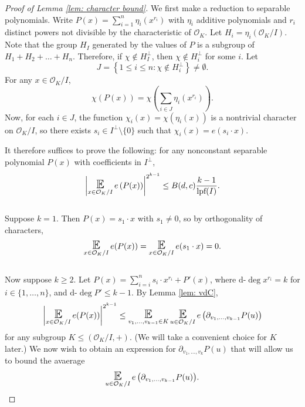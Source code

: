 \documentclass{amsart}
\theoremstyle{definition}
\numberwithin{equation}{section}
\newcommand{\mO}{\mathcal{O}}
\newcommand{\es}{\emptyset}
\newcommand{\lpf}{\normalfont\text{lpf}}
\DeclareMathOperator*{\E}{\text{\Large $\mathbb{E}$}}
\newcommand{\ddeg}{\text{d-}\deg}
\begin{document}
\begin{proof}[Proof of Lemma \ref{lem: character bound}]
	We first make a reduction to separable polynomials.
    Write $P(x) = \sum_{i=1}^n \eta_i(x^{r_i})$ with $\eta_i$ additive polynomials and $r_i$ distinct powers not divisible by the characteristic of $\mO_K$.
    Let $H_i = \eta_i(\mO_K/I)$.
    Note that the group $H_I$ generated by the values of $P$ is a subgroup of $H_1 + H_2 + \ldots + H_n$.
    Therefore, if $\chi \notin H_I^{\perp}$, then $\chi \notin H_i^{\perp}$ for some $i$.
    Let
	\begin{equation*}
		J = \left\{ 1 \le i \le n : \chi \notin H_i^{\perp} \right\} \ne \es.
	\end{equation*}
	For any $x \in \mO_K/I$,
	\begin{equation*}
		\chi(P(x)) = \chi \left( \sum_{i \in J}{\eta_i(x^{r_i})} \right).
	\end{equation*}
	Now, for each $i \in J$, the function $\chi_i(x) = \chi(\eta_i(x))$ is a nontrivial character on $\mO_K/I$, so there exists $s_i \in I^{\perp} \setminus \{0\}$ such that $\chi_i(x) = e(s_i \cdot x)$.

	It therefore suffices to prove the following: for any nonconstant separable polynomial $P(x)$ with coefficients in $I^{\perp}$,
	\begin{equation*}
		\left| \E_{x \in \mO_K/I}{e \left( P(x) \right)} \right|^{2^{k-1}} \le B(d,c) \frac{k-1}{\lpf(I)}.
	\end{equation*} \\
	
	Suppose $k = 1$.
	Then $P(x) = s_1 \cdot x$ with $s_1 \ne 0$, so by orthogonality of characters,
	\begin{equation*}
		\E_{x \in \mO_K/I}{e(P(x))} = \E_{x \in \mO_K/I}{e(s_1 \cdot x)} = 0.
	\end{equation*} \\
	
	Now suppose $k \ge 2$.
	Let $P(x) = \sum_{i=i}^n{s_i \cdot x^{r_i}} + P'(x)$, where $\ddeg{x^{r_i}} = k$ for $i \in \{1, \dots, n\}$, and $\ddeg{P'} \le k-1$.
	By Lemma \ref{lem: vdC},
	\begin{equation*}
		\left| \E_{x \in \mO_K/I}{e(P(x))} \right|^{2^{k-1}} \le \E_{v_1, \dots, v_{k-1} \in K}{\E_{u \in \mO_K/I}{e \left( \partial_{v_1, \dots, v_{k-1}}P(u) \right)}}
	\end{equation*}
	for any subgroup $K \le (\mO_K/I, +)$.
	(We will take a convenient choice for $K$ later.)
	We now wish to obtain an expression for $\partial_{v_1, \dots, v_k}P(u)$ that will allow us to bound the avaerage
	\begin{equation*}
		\E_{u \in \mO_K/I}{e \left( \partial_{v_1, \dots, v_{k-1}}P(u) \right)}.
	\end{equation*}
	

\end{proof}
\end{document}
